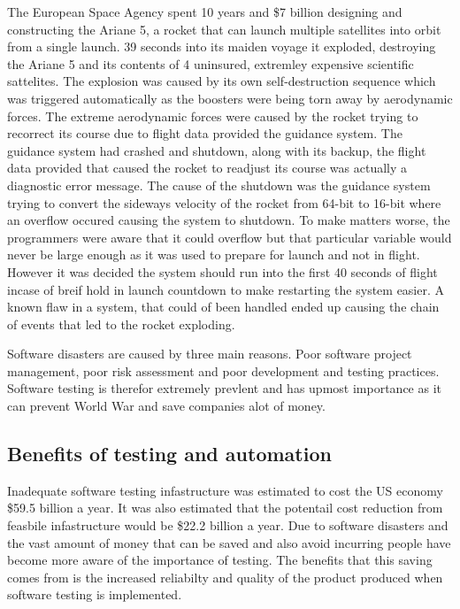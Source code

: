 \documentclass{article}
\begin{document}
\par The European Space Agency spent 10 years and \$7 billion designing and constructing the Ariane 5, a rocket that can launch multiple satellites into orbit from a single launch. 39 seconds into its maiden voyage it exploded, destroying the Ariane 5 and its contents of 4 uninsured, extremley expensive scientific sattelites. The explosion was caused by its own self-destruction sequence which was triggered automatically as the boosters were being torn away by aerodynamic forces. The extreme aerodynamic forces were caused by the rocket trying to recorrect its course due to flight data provided the guidance system. The guidance system had crashed and shutdown, along with its backup, the flight data provided that caused the rocket to readjust its course was actually a diagnostic error message. The cause of the shutdown was the guidance system trying to convert the sideways velocity of the rocket from 64-bit to 16-bit where an overflow occured causing the system to shutdown. To make matters worse, the programmers were aware that it could overflow but that particular variable would never be large enough as it was used to prepare for launch and not in flight. However it was decided the system should run into the first 40 seconds of flight incase of breif hold in launch countdown to make restarting the system easier. A known flaw in a system, that could of been handled ended up causing the chain of events that led to the rocket exploding.\cite{Ariane5}

\par  Software disasters are caused by three main reasons. Poor software project management, poor risk assessment and poor development and testing practices.\cite{mcquaid2012software} Software testing is therefor extremely prevlent and has upmost importance as it can prevent World War and save companies alot of money.


\subsection{Benefits of testing and automation}

\par Inadequate software testing infastructure was estimated to cost the US economy \$59.5 billion a year.\cite{NISTReport} It was also estimated that the potentail cost reduction from feasbile infastructure would be \$22.2 billion a year. \cite{NISTReport} Due to software disasters and the vast amount of money that can be saved and also avoid incurring people have become more aware of the importance of testing. The benefits that this saving comes from is the increased reliabilty and quality of the product produced when software testing is implemented.
\end{document}
